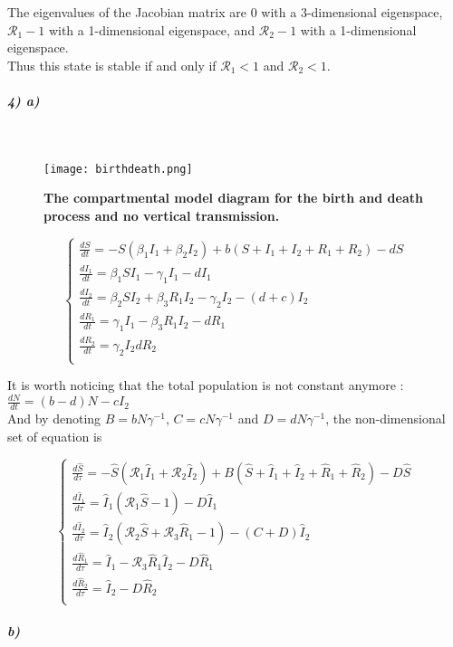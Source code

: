 \documentclass{article}
\begin{document}
The eigenvalues of the Jacobian matrix are $0$ with a 3-dimensional eigenspace, $\pmb{\mathcal{R}}_1-1$ with a 1-dimensional eigenspace, and $\pmb{\mathcal{R}}_2-1$ with a 1-dimensional eigenspace. \\

Thus this state is stable if and only if $\pmb{\mathcal{R}}_1<1$ and $\pmb{\mathcal{R}}_2<1$.

\subparagraph{4) a)}
\

\begin{figure}[H]
	  \centering
  	\texttt{[image: birthdeath.png]}
  	\caption{\textbf{The compartmental model diagram for the birth and death process and no vertical transmission.}}
	\end{figure}

$$ \displaystyle \left \{
    \begin{array}{ll}
        \frac{dS}{dt}=-S(\beta_1 I_1+\beta_2 I_2)+b(S+I_1+I_2+R_1+R_2)-dS\\
		\frac{dI_1}{dt}= \beta_1 S I_1 - \gamma_1 I_1 -dI_1 \\
		\frac{dI_2}{dt}= \beta_2 S I_2+\beta_3 R_1 I_2 - \gamma_2 I_2 -(d+c) I_2 \\
		\frac{dR_1}{dt}= \gamma_1 I_1-\beta_3 R_1 I_2 - d R_1 \\
		\frac{dR_2}{dt}= \gamma_2 I_2 d R_2 \\
    \end{array}
\right. $$

It is worth noticing that the total population is not constant anymore :$\frac{dN}{dt}=(b-d)N-c I_2$\\

And by denoting $B=bN\gamma^{-1}$, $C=cN\gamma^{-1}$ and $D=dN\gamma^{-1}$, the non-dimensional set of equation is 

$$ \displaystyle \left \{
    \begin{array}{ll}
        \frac{d\widehat{S}}{d\tau}=-\widehat{S}(\pmb{\mathcal{R}}_1 \widehat{I}_1+ \pmb{\mathcal{R}}_2 \widehat{I}_2)+B(\widehat{S}+\widehat{I}_1+\widehat{I}_2+\widehat{R}_1+\widehat{R}_2)-D \widehat{S}\\
		\frac{d\widehat{I}_1}{d\tau}= \widehat{I}_1(\pmb{\mathcal{R}}_1 \widehat{S}-1) -D \widehat{I}_1\\
		\frac{d\widehat{I}_2}{d\tau}= \widehat{I}_2(\pmb{\mathcal{R}}_2 \widehat{S} + \pmb{\mathcal{R}}_3 \widehat{R}_1 - 1)-(C+D) \widehat{I}_2 \\
		\frac{d\widehat{R}_1}{d\tau}= \widehat{I}_1-\pmb{\mathcal{R}}_3 \widehat{R}_1 \widehat{I}_2 -D \widehat{R}_1\\
		\frac{d\widehat{R}_2}{d\tau}= \widehat{I}_2 -D \widehat{R}_2\\
    \end{array}
\right. $$
\subparagraph{b)}
\
\end{document}
